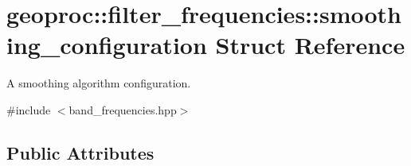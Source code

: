 \hypertarget{structgeoproc_1_1filter__frequencies_1_1smoothing__configuration}{}\section{geoproc\+:\+:filter\+\_\+frequencies\+:\+:smoothing\+\_\+configuration Struct Reference}
\label{structgeoproc_1_1filter__frequencies_1_1smoothing__configuration}


A smoothing algorithm configuration.  




{\ttfamily \#include $<$band\+\_\+frequencies.\+hpp$>$}

\subsection*{Public Attributes}
